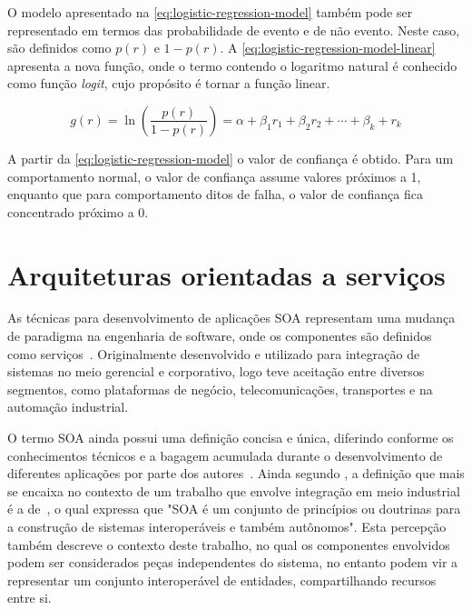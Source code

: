 O modelo apresentado na \cref{eq:logistic-regression-model} também pode ser representado em termos
das probabilidade de evento e de não evento. Neste caso, são definidos como $p(r)$ e $1 - p(r)$. A
\cref{eq:logistic-regression-model-linear} apresenta a nova função, onde o termo contendo o
logaritmo natural é conhecido como função \emph{logit}, cujo propósito é tornar a função linear.

\begin{equation}
  g(r) =
  \ln \left ( \frac{p(r)}{1 - p(r)} \right ) =
  \alpha + \beta_{1} r_{1} + \beta_{2} r_{2} + \cdots + \beta_{k} + r_{k}
  \label{eq:logistic-regression-model-linear}
\end{equation}

A partir da \cref{eq:logistic-regression-model} o valor de confiança é obtido. Para um comportamento
normal, o valor de confiança assume valores próximos a \num{1}, enquanto que para comportamento
ditos de falha, o valor de confiança fica concentrado próximo a \num{0}.


\section{Arquiteturas orientadas a serviços}
\label{sec:arquiteturas-orientadas-servicos}

As técnicas para desenvolvimento de aplicações \gls{SOA} representam uma mudança de paradigma na
engenharia de software, onde os componentes são definidos como serviços~\cite{ramollari2007survey}.
Originalmente desenvolvido e utilizado para integração de sistemas no meio gerencial e corporativo,
logo teve aceitação entre diversos segmentos, como plataformas de negócio, telecomunicações,
transportes e na automação industrial.

O termo \gls{SOA} ainda possui uma definição concisa e única, diferindo conforme os conhecimentos
técnicos e a bagagem acumulada durante o desenvolvimento de diferentes aplicações por parte dos
autores~\cite{candido2013soa}. Ainda segundo \cite{candido2013soa}, a definição que mais se encaixa
no contexto de um trabalho que envolve integração em meio industrial é a
de~\cite{jammes2005service}, o qual expressa que "\gls{SOA} é um conjunto de princípios ou doutrinas
para a construção de sistemas interoperáveis e também autônomos". Esta percepção também descreve o
contexto deste trabalho, no qual os componentes envolvidos podem ser considerados peças
independentes do sistema, no entanto podem vir a representar um conjunto interoperável de entidades,
compartilhando recursos entre si.

